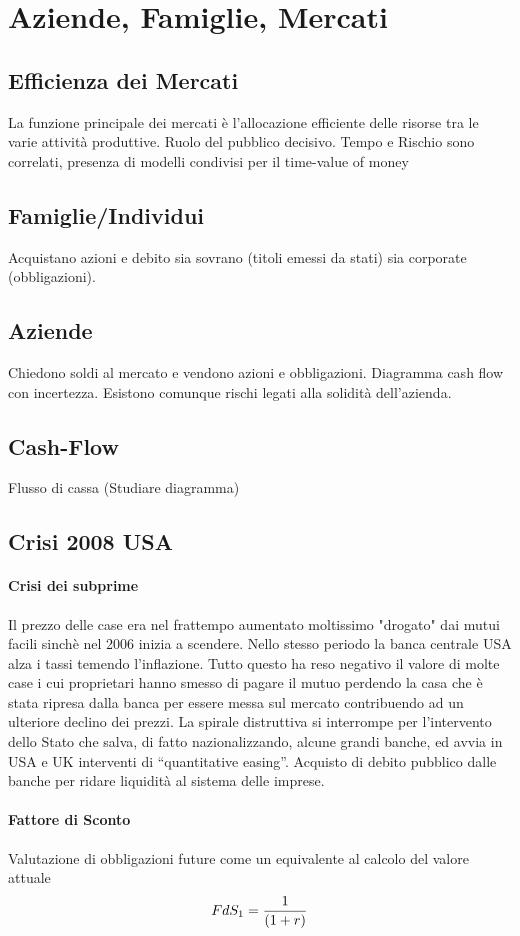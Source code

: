 \documentclass[12pt]{article}
\begin{document}
\section{Aziende, Famiglie, Mercati}
\subsection{Efficienza dei Mercati}
La funzione principale dei mercati è l’allocazione efficiente delle risorse tra le varie attività produttive. Ruolo del pubblico decisivo. Tempo e Rischio sono correlati, presenza di modelli condivisi per il time-value of money
\subsection{Famiglie/Individui}
Acquistano azioni e debito sia sovrano (titoli emessi da stati) sia corporate (obbligazioni).
\subsection{Aziende}
Chiedono soldi al mercato e vendono azioni e obbligazioni. Diagramma cash flow con incertezza. Esistono comunque rischi legati alla solidità dell’azienda.
\subsection{Cash-Flow}
Flusso di cassa (Studiare diagramma)
\subsection{Crisi 2008 USA}
\paragraph{Crisi dei subprime}
Il prezzo delle case era nel frattempo aumentato moltissimo "drogato" dai mutui facili sinchè
nel 2006 inizia a scendere. Nello stesso periodo la banca centrale USA alza i tassi temendo
l’inflazione. Tutto questo ha reso negativo il valore di molte case i cui proprietari hanno smesso di pagare il mutuo perdendo la casa che è stata ripresa dalla banca per essere messa sul mercato contribuendo ad un ulteriore declino dei prezzi. La spirale distruttiva si interrompe per l’intervento dello Stato che salva, di fatto nazionalizzando, alcune grandi banche, ed avvia in USA e UK interventi di “quantitative easing”. Acquisto di debito pubblico dalle banche per ridare liquidità al sistema delle imprese.
\paragraph{Fattore di Sconto} Valutazione di obbligazioni future come un equivalente al calcolo del valore attuale
$$FdS_1={1\over(1+r)}$$
\end{document}
